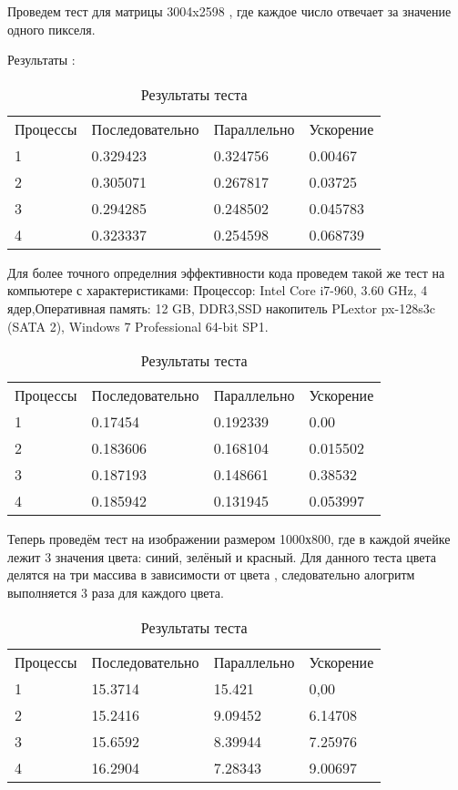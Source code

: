 \documentclass{report}
\begin{document}
\par Проведем тест для матрицы 3004x2598 , где каждое число отвечает за значение одного пикселя. 
\par Результаты :

\begin{table}[!h]
\caption{Результаты теста}
\centering
\begin{tabular}{p{3cm} p{4cm} p{4cm} p{4cm}}
Процессы & Последовательно & Параллельно & Ускорение  \\
1        &  0.329423       &  0.324756   &  0.00467      \\
2        &  0.305071       &  0.267817   &  0.03725      \\
3        &  0.294285       &  0.248502   &  0.045783      \\
4        &  0.323337       &  0.254598   &  0.068739
\end{tabular}
\end{table}

\par Для более точного определния эффективности кода проведем такой же тест на компьютере с характеристиками: Процессор: Intel Core i7-960, 3.60 GHz, 4 ядер,Оперативная память: 12 GB, DDR3,SSD накопитель PLextor px-128s3c (SATA 2), Windows 7 Professional 64-bit SP1.

\begin{table}[!h]
\caption{Результаты теста}
\centering
\begin{tabular}{p{3cm} p{4cm} p{4cm} p{4cm}}
Процессы & Последовательно & Параллельно & Ускорение  \\
1        & 0.17454          & 0.192339     & 0.00       \\
2        & 0.183606         & 0.168104     & 0.015502      \\
3        & 0.187193         & 0.148661     & 0.38532      \\
4        & 0.185942         & 0.131945     & 0.053997     
\end{tabular}
\end{table}

\par Теперь проведём тест на изображении размером 1000х800, где в каждой ячейке лежит 3 значения цвета: синий, зелёный и красный. Для данного теста цвета делятся на три массива в зависимости от цвета , следовательно алогритм выполняется 3 раза для каждого цвета.
\newpage

\begin{table}[!h]
\caption{Результаты теста}
\centering
\begin{tabular}{p{3cm} p{4cm} p{4cm} p{4cm}}
Процессы & Последовательно & Параллельно & Ускорение  \\
1        & 15.3714          & 15.421     & 0,00      \\
2        & 15.2416         &  9.09452     & 6.14708      \\
3        & 15.6592         & 8.39944     & 7.25976       \\
4        &  16.2904         &  7.28343   & 9.00697      
\end{tabular}
\end{table}
\end{document}

